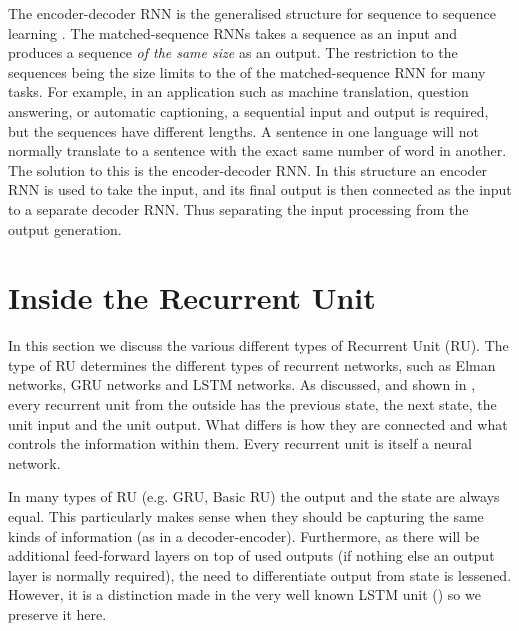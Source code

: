 \documentclass[12pt,parskip]{komatufte}
\begin{document}
The encoder-decoder RNN is the generalised structure for sequence to sequence learning .
The matched-sequence RNNs takes a sequence as an input and produces a sequence \emph{of the same size} as an output.
The restriction to the sequences being the size limits to the of the matched-sequence RNN for many tasks.
For example, in an application such as machine translation, question answering, or automatic captioning, a sequential input and output is required, but the sequences have different lengths.
A sentence in one language will not normally translate to a sentence with the exact same number of word in another.
The solution to this is the encoder-decoder RNN.
In this structure an encoder RNN is used to take the input, and its final output is then connected as the input to a separate decoder RNN.
Thus separating the input processing from the output generation.




\section{Inside the Recurrent Unit}
In this section we discuss the various different types of Recurrent Unit (RU).
The type of RU determines the different types of recurrent networks, such as Elman networks, GRU networks and LSTM networks.
As discussed, and shown in , every recurrent unit from the outside has the previous state, the next state, the unit input and the unit output.
What differs is how they are connected and what controls the information within them.
Every recurrent unit is itself a neural network.

In many types of RU (e.g. GRU, Basic RU) the output and the state are always equal.
This particularly makes sense when they should be capturing the same kinds of information (as in a decoder-encoder).
Furthermore, as there will be additional feed-forward layers on top of used outputs (if nothing else an output layer is normally required), the need to differentiate output from state is lessened.
However, it is a distinction made in the very well known LSTM unit () so we preserve it here.
\end{document}
